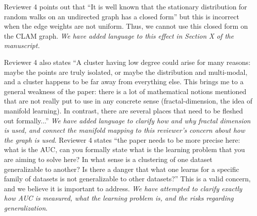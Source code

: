 \documentclass{article}
\begin{document}
Reviewer 4 points out that ``It is well known that the stationary distribution for random walks on an undirected graph has a closed form'' but this is incorrect when the edge weights are not uniform.
Thus, we cannot use this closed form on the CLAM graph.
\emph{We have added language to this effect in Section X of the manuscript.}

Reviewer 4 also states ``A cluster having low degree could arise for many reasons: maybe the points are truly isolated, or maybe the distribution and multi-modal, and a cluster happens to be far away from everything else. 
This brings me to a general weakness of the paper: there is a lot of mathematical notions mentioned that are not really put to use in any concrete sense (fractal-dimension, the idea of manifold learning). In contrast, there are several places that need to be fleshed out formally...''
\emph{We have added language to clarify how and why fractal dimension is used, and connect the manifold mapping to this reviewer's concern about how the graph is used}.
Reviewer 4 states ``the paper needs to be more precise here: what is the AUC, can you formally state what is the learning problem that you are aiming to solve here? In what sense is a clustering of one dataset generalizable to another? Is there a danger that what one learns for a specific family of datasets is not generalizable to other datasets?''
This is a valid concern, and we believe it is important to address.
\emph{We have attempted to clarify exactly how AUC is measured, what the learning problem is, and the risks regarding generalization}.
\end{document}
